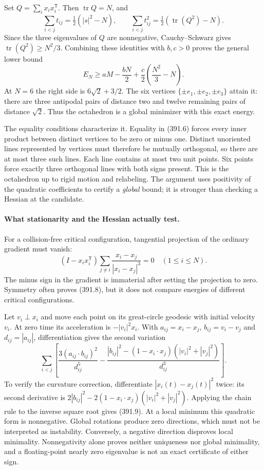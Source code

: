 \documentclass[11pt]{article}
\begin{document}
Set $Q=\sum_i x_ix_i^{\mathsf T}$. Then $\operatorname{tr}Q=N$,
and
\[
 \sum_{i<j}t_{ij}=\tfrac12(|s|^2-N),\qquad
 \sum_{i<j}t_{ij}^2=\tfrac12(\operatorname{tr}(Q^2)-N).
\]
Since the three eigenvalues of $Q$ are nonnegative, Cauchy--Schwarz
gives $\operatorname{tr}(Q^2)\geq N^2/3$. Combining these identities
with $b,c>0$ proves the general lower bound
\[
 E_N\geq aM-\frac{bN}{2}+
                  \frac c2\left(\frac{N^2}{3}-N\right).
 \tag{391.7}
\]
At $N=6$ the right side is $6\sqrt2+3/2$. The six vertices
$\{\pm e_1,\pm e_2,\pm e_3\}$ attain it: there are three antipodal
pairs of distance two and twelve remaining pairs of distance $\sqrt2$.
Thus the octahedron is a global minimizer with this exact energy.

The equality conditions characterize it. Equality in (391.6) forces
every inner product between distinct vertices to be zero or minus
one. Distinct unoriented lines represented by vertices must therefore
be mutually orthogonal, so there are at most three such lines. Each
line contains at most two unit points. Six points force exactly three
orthogonal lines with both signs present. This is the octahedron up
to rigid motion and relabeling. The argument uses positivity of the
quadratic coefficients to certify a \emph{global} bound; it is
stronger than checking a Hessian at the candidate.

\paragraph{What stationarity and the Hessian actually test.}
For a collision-free critical configuration, tangential projection
of the ordinary gradient must vanish:
\[
 (I-x_ix_i^{\mathsf T})
       \sum_{j\ne i}\frac{x_i-x_j}{|x_i-x_j|^3}=0
       \quad(1\leq i\leq N).
 \tag{391.8}
\]
The minus sign in the gradient is immaterial after setting the
projection to zero. Symmetry often proves (391.8), but it does not
compare energies of different critical configurations.

Let $v_i\perp x_i$ and move each point on its great-circle geodesic
with initial velocity $v_i$. At zero time its acceleration is
$-|v_i|^2x_i$. With $a_{ij}=x_i-x_j$, $b_{ij}=v_i-v_j$ and
$d_{ij}=|a_{ij}|$, differentiation gives the second variation
\[
 \sum_{i<j}\left[
 \frac{3(a_{ij}\cdot b_{ij})^2}{d_{ij}^5}
 -\frac{|b_{ij}|^2-(1-x_i\cdot x_j)(|v_i|^2+|v_j|^2)}{d_{ij}^3}
 \right].
 \tag{391.9}
\]
To verify the curvature correction, differentiate
$|x_i(t)-x_j(t)|^2$ twice: its second derivative is
$2|b_{ij}|^2-2(1-x_i\cdot x_j)(|v_i|^2+|v_j|^2)$.
Applying the chain rule to the inverse square root gives (391.9).
At a local minimum this quadratic form is nonnegative. Global
rotations produce zero directions, which must not be interpreted as
instability. Conversely, a negative direction disproves local
minimality. Nonnegativity alone proves neither uniqueness nor global
minimality, and a floating-point nearly zero eigenvalue is not an
exact certificate of either sign.
\end{document}
